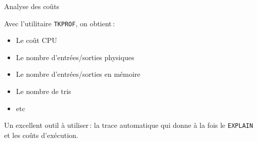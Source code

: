 
\begin{frame}{Analyse des coûts}{

Avec l'utilitaire \texttt{TKPROF}, on obtient\,:

\begin{itemize}
    \item Le coût CPU
   \item Le nombre d'entrées/sorties physiques
   \item Le nombre d'entrées/sorties en mémoire
   \item Le nombre de tris
   \item etc
\end{itemize}

Un excellent outil à utiliser\,: la
trace automatique qui donne à la fois le 
\texttt{EXPLAIN} et les coûts d'exécution.
}\end{frame}


